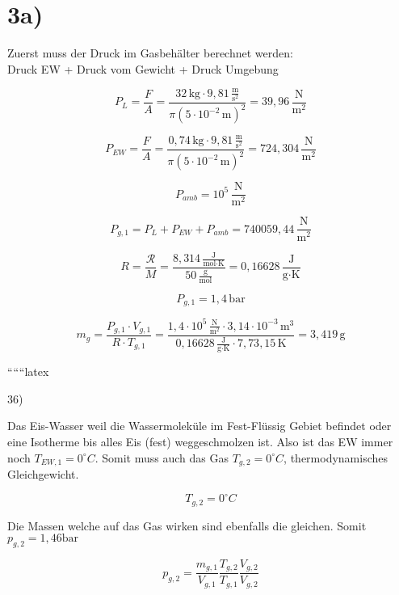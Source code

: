 

\section*{3a)}

Zuerst muss der Druck im Gasbehälter berechnet werden: \\
Druck EW + Druck vom Gewicht + Druck Umgebung

\[
P_L = \frac{F}{A} = \frac{32 \, \text{kg} \cdot 9,81 \, \frac{\text{m}}{\text{s}^2}}{\pi \left(5 \cdot 10^{-2} \, \text{m}\right)^2} = 39,96 \, \frac{\text{N}}{\text{m}^2}
\]

\[
P_{EW} = \frac{F}{A} = \frac{0,74 \, \text{kg} \cdot 9,81 \, \frac{\text{m}}{\text{s}^2}}{\pi \left(5 \cdot 10^{-2} \, \text{m}\right)^2} = 724,304 \, \frac{\text{N}}{\text{m}^2}
\]

\[
P_{amb} = 10^5 \, \frac{\text{N}}{\text{m}^2}
\]

\[
P_{g,1} = P_L + P_{EW} + P_{amb} = 740059,44 \, \frac{\text{N}}{\text{m}^2}
\]

\[
R = \frac{\mathcal{R}}{M} = \frac{8,314 \, \frac{\text{J}}{\text{mol} \cdot \text{K}}}{50 \, \frac{\text{g}}{\text{mol}}} = 0,16628 \, \frac{\text{J}}{\text{g} \cdot \text{K}}
\]

\[
P_{g,1} = 1,4 \, \text{bar}
\]

\[
m_g = \frac{P_{g,1} \cdot V_{g,1}}{R \cdot T_{g,1}} = \frac{1,4 \cdot 10^5 \, \frac{\text{N}}{\text{m}^2} \cdot 3,14 \cdot 10^{-3} \, \text{m}^3}{0,16628 \, \frac{\text{J}}{\text{g} \cdot \text{K}} \cdot 7,73,15 \, \text{K}} = 3,419 \, \text{g}
\]

``````latex


36)

Das Eis-Wasser weil die Wassermoleküle im Fest-Flüssig Gebiet befindet oder eine Isotherme bis alles Eis (fest) weggeschmolzen ist. Also ist das EW immer noch $T_{EW,1} = 0^\circ C$. Somit muss auch das Gas $T_{g,2} = 0^\circ C$, thermodynamisches Gleichgewicht.

\[
T_{g,2} = 0^\circ C
\]

Die Massen welche auf das Gas wirken sind ebenfalls die gleichen. Somit $p_{g,2} = 1,46 \text{bar}$

\[
p_{g,2} = \frac{m_{g,1}}{V_{g,1}} \frac{T_{g,2}}{T_{g,1}} \frac{V_{g,2}}{V_{g,2}}
\]